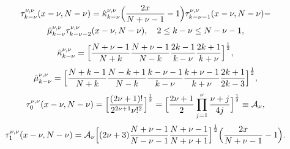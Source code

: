 \begin{multline*}
\tau_{k-\nu}^{\nu,\nu}(x-\nu, N-\nu)=
\hat{\kappa}_{k-\nu}^{\nu,\nu}
\Bigl(
\frac{2x}{N+\nu-1}-1
\Bigr)
\tau_{k-\nu-1}^{\nu,\nu}(x-\nu, N-\nu)-\\
\hat{\mu}_{k-\nu}^{\nu,\nu}
\tau_{k-\nu-2}^{\nu,\nu}(x-\nu, N-\nu),
\quad 2 \le k-\nu \le N-\nu-1,
\end{multline*}
\begin{equation*}
\hat{\kappa}_{k-\nu}^{\nu,\nu}=
\Bigl[
\frac{N+\nu-1}{N+k}
\frac{N+\nu-1}{N-k}
\frac{2k-1}{k-\nu}
\frac{2k+1}{k+\nu}
\Bigr]^\frac{1}{2},
\end{equation*}
\begin{equation*}
\hat{\mu}_{k-\nu}^{\nu,\nu}=
\Bigl[
\frac{N+k-1}{N+k}
\frac{N-k+1}{N-k}
\frac{k-\nu-1}{k-\nu}
\frac{k+\nu-1}{k+\nu}
\frac{2k+1}{2k-3}
\Bigr]^\frac{1}{2},
\end{equation*}
\begin{equation*}
\tau_{0}^{\nu,\nu}(x-\nu, N-\nu)=
\Bigl[
\frac{(2\nu+1)!}{2^{2\nu+1}\nu!^2}
\Bigr]^\frac{1}{2}=
\Bigl[
\frac{2\nu+1}{2}
\prod_{j=1}^{\nu}\frac{\nu+j}{4j}
\Bigr]^\frac{1}{2}
\equiv \mathcal{A}_\nu,
\end{equation*}
\begin{equation*}
\tau_{1}^{\nu,\nu}(x-\nu, N-\nu)=
\mathcal{A}_\nu
\Bigl[
(2\nu+3)
\frac{N+\nu-1}{N-\nu-1}
\frac{N+\nu-1}{N+\nu+1}
\Bigr]^\frac{1}{2}
\Bigl(
\frac{2x}{N+\nu-1}-1
\Bigr).
\end{equation*} 